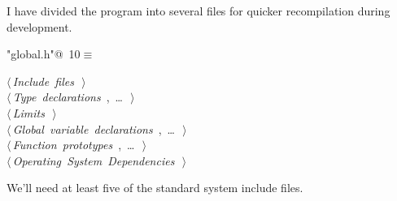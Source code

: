 \documentclass[a4paper]{report}
\begin{document}
I have divided the program into several files for quicker
recompilation during development.
\begin{flushleft} \small
\begin{minipage}{\linewidth}\label{scrap1}\raggedright\small
{} \verb@"global.h"@\nobreak\ {\footnotesize {10}}$\equiv$
\vspace{-1ex}
\begin{list}{}{} \item
\mbox{}\verb@@\hbox{$\langle\,${\it Include files}\nobreak\ {\footnotesize {}}$\,\rangle$}\verb@@\\
\mbox{}\verb@@\hbox{$\langle\,${\it Type declarations}\nobreak\ {\footnotesize {}, \ldots\ }$\,\rangle$}\verb@@\\
\mbox{}\verb@@\hbox{$\langle\,${\it Limits}\nobreak\ {\footnotesize {}}$\,\rangle$}\verb@@\\
\mbox{}\verb@@\hbox{$\langle\,${\it Global variable declarations}\nobreak\ {\footnotesize {}, \ldots\ }$\,\rangle$}\verb@@\\
\mbox{}\verb@@\hbox{$\langle\,${\it Function prototypes}\nobreak\ {\footnotesize {}, \ldots\ }$\,\rangle$}\verb@@\\
\mbox{}\verb@@\hbox{$\langle\,${\it Operating System Dependencies}\nobreak\ {\footnotesize {}}$\,\rangle$}\verb@@{\NWsep}
\end{list}
\vspace{-1.5ex}
\footnotesize
\begin{list}{}{\setlength{\itemsep}{-\parsep}\setlength{\itemindent}{-\leftmargin}}

\item{}
\end{list}
\end{minipage}\vspace{4ex}
\end{flushleft}
We'll need at least five of the standard system include files.
\end{document}
